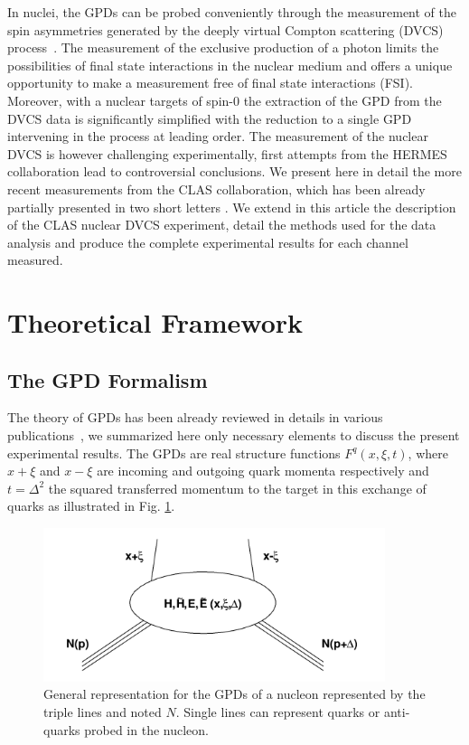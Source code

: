 \documentclass{article}
\begin{document}
In nuclei, the GPDs can be probed conveniently through the measurement of the
spin asymmetries generated by the deeply virtual Compton scattering (DVCS) 
process~\cite{Diehl:2003ny,Belitsky:2005qn,Boffi:2007yc,Guidal:2013rya}. The measurement of the exclusive
production of a photon limits the possibilities of final state interactions in the nuclear 
medium and offers a unique opportunity to make a measurement free of final state interactions 
(FSI). Moreover, with a nuclear targets of spin-0 the extraction of the GPD from the DVCS data 
is significantly simplified with the reduction to a single GPD intervening in the process at leading order. The 
measurement of the nuclear DVCS is however challenging experimentally, first attempts from 
the HERMES collaboration \cite{Airapetian:2009cga} lead to controversial conclusions. We present here
in detail the more recent measurements from the CLAS collaboration, which has been already partially presented
in two short letters \cite{Hattawy:2017woc,Hattawy:2018liu}. We extend in this article 
the description of the CLAS nuclear DVCS experiment, detail the methods used for the
data analysis and produce the complete experimental results for each channel measured.


\section{Theoretical Framework}

\subsection{The GPD Formalism}

The theory of GPDs has been already reviewed in details in various 
publications~\cite{Diehl:2003ny,Belitsky:2005qn,Boffi:2007yc,Guidal:2013rya},
we summarized here only necessary elements to discuss the present experimental results.
The GPDs are real structure functions $F^{q}(x,\xi,t)$, where $x+\xi$ and $x-\xi$ are incoming and outgoing quark momenta 
respectively and $t=\Delta^2$ the squared transferred momentum to the target in this exchange of quarks as illustrated in 
Fig. \ref{fig:GPD}. 

\begin{figure}[tbp!]
\center
\includegraphics[width=10.0cm]{fig1/GPD.png}
\caption{General representation for the GPDs of a nucleon represented by the triple lines and noted $N$.
	Single lines can represent quarks or anti-quarks probed in the nucleon.}
\label{fig:GPD}
\end{figure}
\end{document}
